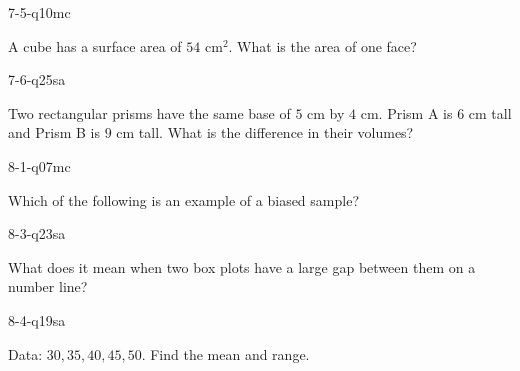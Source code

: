 \begin{practiceQuestion}{7-5-q10}{mc}
\begin{questionText}
A cube has a surface area of $54$ cm$^2$. What is the area of one face?
\end{questionText}
\end{practiceQuestion}

\begin{practiceQuestion}{7-6-q25}{sa}
\begin{questionText}
Two rectangular prisms have the same base of $5$ cm by $4$ cm. Prism A is $6$ cm tall and Prism B is $9$ cm tall. What is the difference in their volumes?
\end{questionText}
\end{practiceQuestion}

\begin{practiceQuestion}{8-1-q07}{mc}
\begin{questionText}
Which of the following is an example of a biased sample?
\end{questionText}
\end{practiceQuestion}

\begin{practiceQuestion}{8-3-q23}{sa}
\begin{questionText}
What does it mean when two box plots have a large gap between them on a number line?
\end{questionText}
\end{practiceQuestion}

\begin{practiceQuestion}{8-4-q19}{sa}
\begin{questionText}
Data: $30, 35, 40, 45, 50$. Find the mean and range.
\end{questionText}
\end{practiceQuestion}

